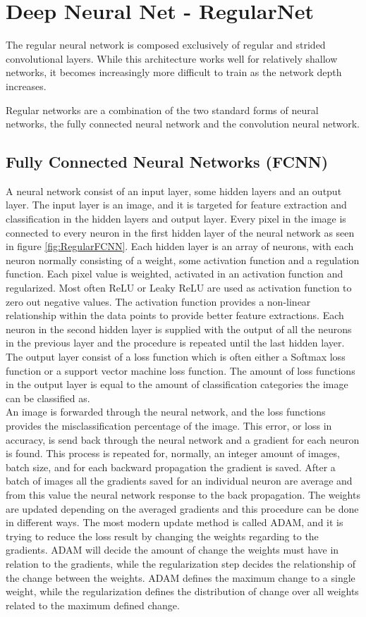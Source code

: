 \section{Deep Neural Net - RegularNet}
The regular neural network is composed exclusively of regular and strided convolutional layers. While this architecture works well for relatively shallow networks, it becomes increasingly more difficult to train as the network depth increases.

Regular networks are a combination of the two standard forms of neural networks, the fully connected neural network and the convolution neural network.

\subsection{Fully Connected Neural Networks (FCNN)}
A neural network consist of an input layer, some hidden layers and an output layer. The input layer is an image, and it is targeted for feature extraction and classification in the hidden layers and output layer. Every pixel in the image is connected to every neuron in the first hidden layer of the neural network as seen in figure \ref{fig:RegularFCNN}.    
Each hidden layer is an array of neurons, with each neuron normally consisting of a weight, some activation function and a regulation function. Each pixel value is weighted, activated in an activation function and regularized. Most often ReLU or Leaky ReLU are used as activation function to zero out negative values. The activation function provides a non-linear relationship within the data points to provide better feature extractions. Each neuron in the second hidden layer is supplied with the output of all the neurons in the previous layer and the procedure is repeated until the last hidden layer. The output layer consist of a loss function which is often either a Softmax loss function or a support vector machine loss function. The amount of loss functions in the output layer is equal to the amount of classification categories the image can be classified as.
\\
An image is forwarded through the neural network, and the loss functions provides the misclassification percentage of the image. This error, or loss in accuracy, is send back through the neural network and a gradient for each neuron is found. This process is repeated for, normally, an integer amount of images, batch size, and for each backward propagation the gradient is saved. After a batch of images all the gradients saved for an individual neuron are average and from this value the neural network response to the back propagation. The weights are updated depending on the averaged gradients and this procedure can be done in different ways. The most modern update method is called ADAM, and it is trying to reduce the loss result by changing the weights regarding to the gradients. ADAM will decide the amount of change the weights must have in relation to the gradients, while the regularization step decides the relationship of the change between the weights. ADAM defines the maximum change to a single weight, while the regularization defines the distribution of change over all weights related to the maximum defined change.

